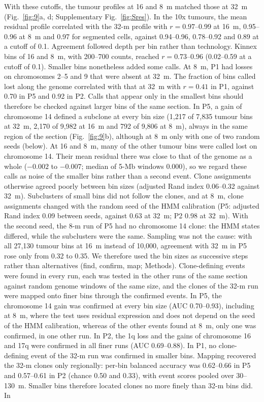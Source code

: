 With these cutoffs, the tumour profiles at 16 and 8~\textmu m matched those at 32~\textmu m (Fig.~\ref{fig:9}a, d; Supplementary Fig.~\ref{fig:Sres}). In the 10x tumours, the mean residual profile correlated with the 32-\textmu m profile with $r = 0.97$--0.99 at 16~\textmu m, 0.95--0.96 at 8~\textmu m and 0.97 for segmented cells, against 0.94--0.96, 0.78--0.92 and 0.89 at a cutoff of 0.1. Agreement followed depth per bin rather than technology. Kinnex bins of 16 and 8~\textmu m, with 200--700 counts, reached $r = 0.73$--0.96 (0.02--0.59 at a cutoff of 0.1). Smaller bins nonetheless added some calls. At 8~\textmu m, P1 had losses on chromosomes 2--5 and 9 that were absent at 32~\textmu m. The fraction of bins called lost along the genome correlated with that at 32~\textmu m with $r = 0.41$ in P1, against 0.70 in P5 and 0.92 in P2. Calls that appear only in the smallest bins should therefore be checked against larger bins of the same section. In P5, a gain of chromosome 14 defined a subclone at every bin size (1,217 of 7,835 tumour bins at 32~\textmu m, 2,170 of 9,982 at 16~\textmu m and 792 of 9,806 at 8~\textmu m), always in the same region of the section (Fig.~\ref{fig:9}b), although at 8~\textmu m only with one of two random seeds (below). At 16 and 8~\textmu m, many of the other tumour bins were called lost on chromosome 14. Their mean residual there was close to that of the genome as a whole ($-0.002$ to $-0.007$; median of 5-Mb windows $0.000$), so we regard these calls as noise of the smaller bins rather than a second event. Clone assignments otherwise agreed poorly between bin sizes (adjusted Rand index 0.06--0.32 against 32~\textmu m). Subclusters of small bins did not follow the clones, and at 8~\textmu m, clone assignments changed with the random seed of the HMM calibration (P5: adjusted Rand index 0.09 between seeds, against 0.63 at 32~\textmu m; P2 0.98 at 32~\textmu m). With the second seed, the 8-\textmu m run of P5 had no chromosome 14 clone: the HMM states differed, while the subclusters were the same. Sampling was not the cause: with all 27,130 tumour bins at 16~\textmu m instead of 10,000, agreement with 32~\textmu m in P5 rose only from 0.32 to 0.35. We therefore used the bin sizes as successive steps rather than alternatives (find, confirm, map; Methods). Clone-defining events were found in every run, each was tested in the other runs of the same section against random genome windows of the same size, and the clones of the 32-\textmu m run were mapped onto finer bins through the confirmed events. In P5, the chromosome 14 gain was confirmed at every bin size (AUC 0.70--0.93), including at 8~\textmu m, where the test uses residual expression and does not depend on the seed of the HMM calibration, whereas of the other events found at 8~\textmu m, only one was confirmed, in one other run. In P2, the 1q loss and the gains of chromosome 16 and 17q were confirmed in all finer runs (AUC 0.69--0.88). In P1, no clone-defining event of the 32-\textmu m run was confirmed in smaller bins. Mapping recovered the 32-\textmu m clones only regionally: per-bin balanced accuracy was 0.62--0.66 in P5 and 0.57--0.61 in P2 (chance 0.50 and 0.33), with event scores pooled over 30--130~\textmu m. Smaller bins therefore located clones no more finely than 32-\textmu m bins did. In 